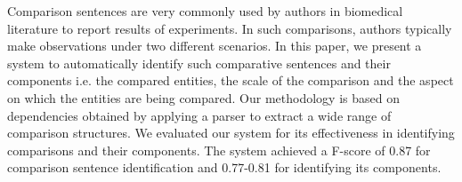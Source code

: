 Comparison sentences are very commonly used by authors in biomedical literature to report results of experiments. In such comparisons, authors typically make observations under two different scenarios. In this paper, we present a system to automatically identify such comparative sentences and their components i.e. the compared entities, the scale of the comparison and the aspect on which the entities are being compared. Our methodology is based on dependencies obtained by applying a parser to extract a wide range of comparison structures. We evaluated our system for its effectiveness in identifying comparisons and their components. The system achieved a F-score of 0.87 for comparison sentence identification and 0.77-0.81 for identifying its components.
